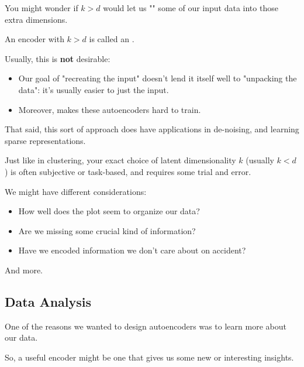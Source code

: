             \begin{concept}
                You might wonder if $k>d$ would let us "" some of our input data into those extra dimensions.
                
                An encoder with $k>d$ is called an .
                
                Usually, this is \textbf{not} desirable:
    
                \begin{itemize}
                    \item Our goal of "recreating the input" doesn't lend it itself well to "unpacking the data": it's usually easier to just  the input.
                    \item Moreover,  makes these autoencoders hard to train.
                \end{itemize}

                That said, this sort of approach does have applications in de-noising, and learning sparse representations.
            \end{concept}

            \subsecdiv

            Just like in clustering, your exact choice of latent dimensionality $k$ (usually $k < d$) is often subjective or task-based, and requires some trial and error.

            We might have different considerations:

            \begin{itemize}
                \item How well does the plot seem to organize our data?
                \item Are we missing some crucial kind of information?
                \item Have we encoded information we don't care about on accident?
            \end{itemize}

            And more.

    \subsection{Data Analysis}

        One of the reasons we wanted to design autoencoders was to learn more about our data.

        So, a useful encoder might be one that gives us some new or interesting insights.\\

